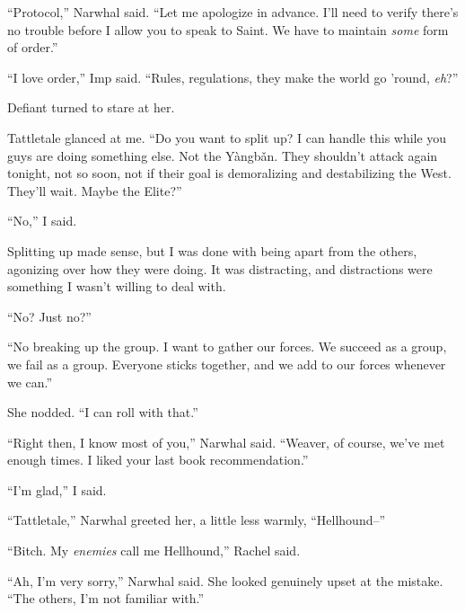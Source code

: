 ``Protocol,'' Narwhal said.  ``Let me apologize in advance.  I'll need to verify there's no trouble before I allow you to speak to Saint.  We have to maintain \emph{some} form of order.''



``I love order,'' Imp said.  ``Rules, regulations, they make the world go 'round, \emph{eh}?''



Defiant turned to stare at her.



Tattletale glanced at me.  ``Do you want to split up?  I can handle this while you guys are doing something else.  Not the Y\`{a}ngb\v{a}n.  They shouldn't attack again tonight, not so soon, not if their goal is demoralizing and destabilizing the West.  They'll wait.  Maybe the Elite?''



``No,'' I said.



Splitting up made sense, but I was done with being apart from the others, agonizing over how they were doing.  It was distracting, and distractions were something I wasn't willing to deal with.



``No?  Just no?''



``No breaking up the group.  I want to gather our forces.  We succeed as a group, we fail as a group.  Everyone sticks together, and we add to our forces whenever we can.''



She nodded.  ``I can roll with that.''



``Right then, I know most of you,'' Narwhal said.  ``Weaver, of course, we've met enough times.  I liked your last book recommendation.''



``I'm glad,'' I said.



``Tattletale,'' Narwhal greeted her, a little less warmly, ``Hellhound--''



``Bitch.  My \emph{enemies} call me Hellhound,'' Rachel said.



``Ah, I'm very sorry,'' Narwhal said.  She looked genuinely upset at the mistake.  ``The others, I'm not familiar with.''



